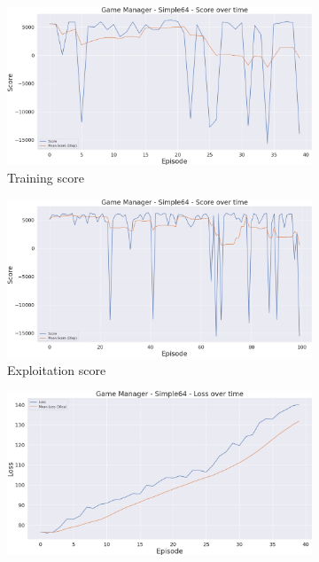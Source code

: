 \begin{figure}[h]
    \centering
    \begin{subfigure}[b]{0.495\textwidth}
        \includegraphics[width=1\textwidth]{figs/multi_dqn_game_manager/score.png}
        \caption{Training score}
    \end{subfigure}
    \begin{subfigure}[b]{0.495\textwidth}
        \includegraphics[width=1\textwidth]{figs/multi_dqn_game_manager/exploit/score.png}
        \caption{Exploitation score}
    \end{subfigure}
    \begin{subfigure}[b]{0.495\textwidth}
        \includegraphics[width=1\textwidth]{figs/multi_dqn_game_manager/loss.png}

\end{subfigure}
\end{figure}

